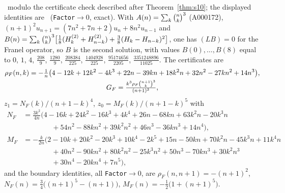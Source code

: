 \begin{theorem}[Franel]\label{thm:franel}
\Proved\ modulo the certificate check described after Theorem~\ref{thm:s10}; the displayed
identities are \Proved\ (\texttt{Factor}$\to0$, exact).
With $A(n)=\sum_k\binom{n}{k}^3$ (A000172), $(n+1)^2u_{n+1}=(7n^2+7n+2)u_n+8n^2u_{n-1}$
and $B(n)=\sum_k\binom{n}{k}^3\bigl[\tfrac18(H^{(2)}_{k}+H^{(2)}_{n-k})+\tfrac38(H_k-H_{n-k})^2\bigr]$,
one has $(LB)=0$ for the Franel operator, so $B$ is the second solution, with values
$B(0),\dots,B(8)$ equal to
$0$, $1$, $4$, $\tfrac{208}9$, $\tfrac{1280}9$, $\tfrac{208384}{225}$,
$\tfrac{1404928}{225}$, $\tfrac{95174656}{2205}$, $\tfrac{3351248896}{11025}$.
The certificates are
\[
 \begin{gathered}
  \rho_F(n,k)=-\tfrac1n\bigl(4-12k+12k^2-4k^3+22n-39kn+18k^2n+32n^2-27kn^2+14n^3\bigr),\\
  G_F=\tfrac{k^3\rho_F\binom{n+1}{k}^3}{(n+1)^3},
 \end{gathered}
\]
$z_1=N_F(k)/(n+1-k)^4$, $z_0=M_F(k)/(n+1-k)^5$ with
{\small
\begin{align*}
  N_F&=\tfrac{3k^2}{4n}\bigl(4-16k+24k^2-16k^3+4k^4+26n-68kn+63k^2n-20k^3n\\
     &\qquad\qquad+54n^2-88kn^2+39k^2n^2+46n^3-36kn^3+14n^4\bigr),\\
  M_F&=-\tfrac{k}{2n}\bigl(2-10k+20k^2-20k^3+10k^4-2k^5+15n-50kn+70k^2n-45k^3n+11k^4n\\
     &\qquad\qquad+40n^2-90kn^2+80k^2n^2-25k^3n^2+50n^3-70kn^3+30k^2n^3\\
     &\qquad\qquad+30n^4-20kn^4+7n^5\bigr),
\end{align*}}
and the boundary identities, all \texttt{Factor}$\to0$, are
$\rho_F(n,n+1)=-(n+1)^2$, $N_F(n)=\tfrac34\bigl((n+1)^5-(n+1)\bigr)$,
$M_F(n)=-\tfrac12\bigl(1+(n+1)^5\bigr)$.
\end{theorem}

